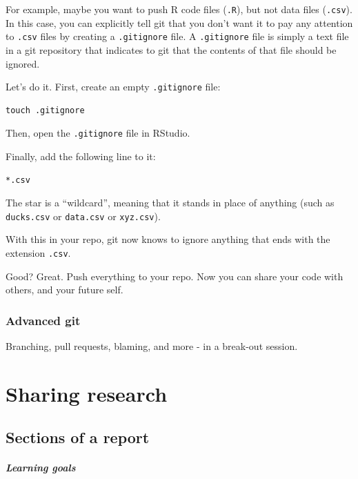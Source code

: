 \documentclass[
]{book}
\begin{document}
For example, maybe you want to push R code files (\texttt{.R}), but not data files (\texttt{.csv}). In this case, you can explicitly tell git that you don't want it to pay any attention to \texttt{.csv} files by creating a \texttt{.gitignore} file. A \texttt{.gitignore} file is simply a text file in a git repository that indicates to git that the contents of that file should be ignored.

Let's do it. First, create an empty \texttt{.gitignore} file:

\begin{verbatim}
touch .gitignore
\end{verbatim}

Then, open the \texttt{.gitignore} file in RStudio.

Finally, add the following line to it:

\begin{verbatim}
*.csv
\end{verbatim}

The star is a ``wildcard'', meaning that it stands in place of anything (such as \texttt{ducks.csv} or \texttt{data.csv} or \texttt{xyz.csv}).

With this in your repo, git now knows to ignore anything that ends with the extension \texttt{.csv}.

Good? Great. Push everything to your repo. Now you can share your code with others, and your future self.

\hypertarget{advanced-git}{%
\section*{Advanced git}\label{advanced-git}}

Branching, pull requests, blaming, and more - in a break-out session.

\hypertarget{part-sharing-research}{%
\part{Sharing research}\label{part-sharing-research}}

\hypertarget{sections-of-a-report}{%
\chapter{Sections of a report}\label{sections-of-a-report}}

\hypertarget{learning-goals-23}{%
\subsubsection*{Learning goals}\label{learning-goals-23}}
\end{document}
